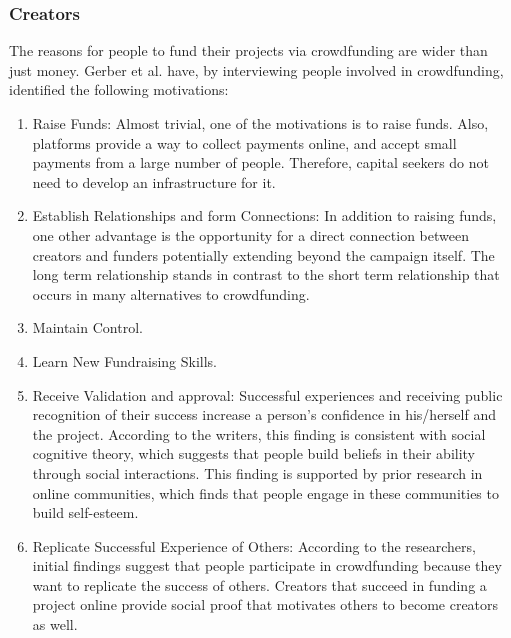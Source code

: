 \subsubsection*{Creators}
The reasons for people to fund their projects via crowdfunding are wider than just money. Gerber et al. \cite{inproceedings} 
have, by interviewing people involved in crowdfunding, identified the following motivations:
\begin{enumerate}
      \item Raise Funds: 
            Almost trivial, one of the motivations is to raise funds. Also, platforms provide a way to
            collect payments online, and accept small payments from a large number of people. Therefore, capital
            seekers do not need to develop an infrastructure for it.

      \item Establish Relationships and form Connections:        
            In addition to raising funds, one other advantage is the opportunity for a direct
            connection between creators and funders potentially extending beyond the campaign itself. The
            long term relationship stands in contrast to the short term relationship that occurs in many alternatives
            to crowdfunding.

      \item Maintain Control.

      \item Learn New Fundraising Skills.

      \item Receive Validation and approval:           
      Successful experiences and receiving public recognition of their success increase
            a person’s confidence in his/herself and the project. According to the writers, this finding is consistent
            with social cognitive theory, which suggests that people build beliefs in their ability through social interactions. This finding is supported by prior research in online communities, which finds that people
            engage in these communities to build self-esteem.

      \item Replicate Successful Experience of Others:          
            According to the researchers, initial findings suggest that
            people participate in crowdfunding because they want to replicate the success of others. Creators that
            succeed in funding a project online provide social proof that motivates others to become creators as
            well.


\end{enumerate}
